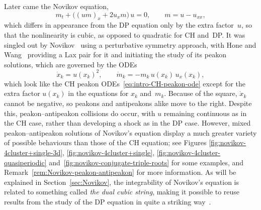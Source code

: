 \documentclass[10pt,a4paper]{article} \pdfoutput=1 
\begin{document}
Later came the Novikov equation,
\begin{equation}
  \label{eq:intro-Novikov}
  m_t + \bigl( (u m)_x + 2 u_x m \bigr) \, u = 0
  ,\qquad
  m = u - u_{xx},
\end{equation}
which differs in appearance from the DP equation only by the extra factor~$u$,
so that the nonlinearity is cubic, as opposed to quadratic for CH and~DP.
It was singled out by Novikov~\cite{novikov:2009:generalizations-of-CH}
using a perturbative symmetry approach,
with Hone and Wang~\cite{hone-wang:2008:cubic-nonlinearity}
providing a Lax pair for it and initiating the study of its peakon solutions,
which are governed by the ODEs
\begin{equation}
  \label{eq:intro-Novikov-peakon-ode}
  \dot x_k = u(x_k)^2
  ,\qquad
  \dot m_k = - m_k \, u(x_k)\, u_x(x_k)
  ,
\end{equation}
which look like the CH peakon ODEs~\eqref{eq:intro-CH-peakon-ode}
except for the extra factor $u(x_k)$ in the equations for $x_k$ and~$m_k$.
Because of the square, $\dot x_k$ cannot be negative, so peakons and antipeakons alike
move to the right. Despite this, peakon--antipeakon collisions do occur,
with $u$ remaining continuous as in the CH case,
rather than developing a shock as in the DP case.
However, mixed peakon--antipeakon solutions of Novikov's equation
display a much greater variety of possible behaviours than
those of the CH equation;
see Figures
\ref{fig:novikov-4cluster+single-3d},
\ref{fig:novikov-4cluster+single},
\ref{fig:novikov-4cluster-quasiperiodic}
and~\ref{fig:novikov-conjugate-triple-roots}
for some examples,
and Remark~\ref{rem:Novikov-peakon-antipeakon} for more information.
As will be explained in Section~\ref{sec:Novikov},
the integrability of Novikov's equation is related to something called
\emph{the dual cubic string}, making it possible to reuse results
from the study of the DP equation in quite a striking way~\cite{hone-lundmark-szmigielski:2009:novikov}.
\end{document}
